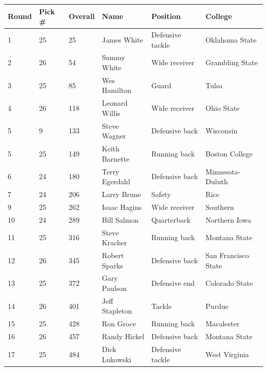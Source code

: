 \documentclass{article}
\begin{document}
\begin{tabular}{llllll}
\toprule
Round & Pick \# & Overall & Name & Position & College \\
\midrule
1 & 25 & 25 & James White & Defensive tackle & Oklahoma State \\
2 & 26 & 54 & Sammy White & Wide receiver & Grambling State \\
3 & 25 & 85 & Wes Hamilton & Guard & Tulsa \\
4 & 26 & 118 & Leonard Willis & Wide receiver & Ohio State \\
5 & 9 & 133 & Steve Wagner & Defensive back & Wisconsin \\
5 & 25 & 149 & Keith Barnette & Running back & Boston College \\
6 & 24 & 180 & Terry Egerdahl & Defensive back & Minnesota-Duluth \\
7 & 24 & 206 & Larry Brune & Safety & Rice \\
9 & 25 & 262 & Isaac Hagins & Wide receiver & Southern \\
10 & 24 & 289 & Bill Salmon & Quarterback & Northern Iowa \\
11 & 25 & 316 & Steve Kracher & Running back & Montana State \\
12 & 26 & 345 & Robert Sparks & Defensive back & San Francisco State \\
13 & 25 & 372 & Gary Paulson & Defensive end & Colorado State \\
14 & 26 & 401 & Jeff Stapleton & Tackle & Purdue \\
15 & 25 & 428 & Ron Groce & Running back & Macalester \\
16 & 26 & 457 & Randy Hickel & Defensive back & Montana State \\
17 & 25 & 484 & Dick Lukowski & Defensive tackle & West Virginia \\
\bottomrule
\end{tabular}
\end{document}
